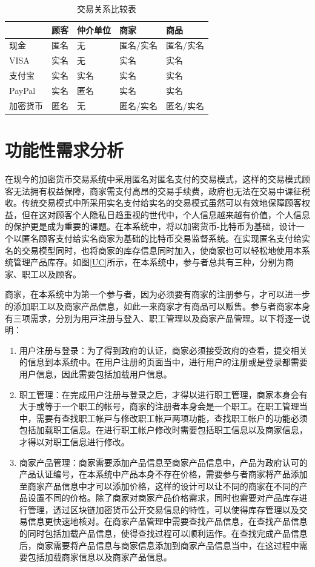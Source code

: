		\begin{table}[!htbp]
		\centering
		\caption{交易关系比较表}
		\label{txvs}
		\begin{tabular}{|l|l|l|l|l|}
		\hline
		 & 顾客 & 仲介单位 & 商家 & 商品 \\ \hline
		现金 & 匿名 & 无 & 匿名/实名 & 匿名/实名 \\ \hline
		VISA & 实名 & 无 & 实名 & 实名 \\ \hline
		支付宝 & 实名 & 实名 & 实名 & 实名 \\ \hline
		PayPal & 实名 & 匿名 & 实名 & 实名 \\ \hline
		加密货币 & 匿名 & 无 & 匿名/实名 & 匿名/实名 \\ \hline
		\end{tabular}
		\end{table}

\section{功能性需求分析}

在现今的加密货币交易系统中采用匿名对匿名⽀付的交易模式，这样的交易模式顾客无法拥有权益保障，商家需支付高昂的交易手续费，政府也无法在交易中课征税收。传统交易模式中所采用实名⽀付给实名的交易模式虽然可以有效地保障顾客权益，但在这对顾客个⼈隐私⽇趋重视的世代中，个⼈信息越来越有价值，个⼈信息的保护更是成为重要的课题。在本系统中，将以加密货币-⽐特币为基础，设计⼀个以匿名顾客⽀付给实名商家为基础的比特币交易监督系统。在实现匿名⽀付给实名的交易模型同时，也将商家的库存信息同时加⼊，使商家也可以轻松地使用本系统管理产品库存。如图\ref{UC}所示，在本系统中，参与者总共有三种，分别为商家、职⼯以及顾客。

商家，在本系统中为第⼀个参与者，因为必须要有商家的注册参与，才可以进⼀步的添加职⼯以及商家产品信息，如此⼀来商家才有商品可以贩售。参与者商家本⾝有三项需求，分别为⽤⼾注册与登⼊、职⼯管理以及商家产品管理。以下将逐⼀说明：


	\begin{enumerate}
	\item 用户注册与登录：为了得到政府的认证，商家必须接受政府的查看，提交相关的信息到本系统中。在用户注册的页面当中，进行用户的注册或是登录都需要用户信息，因此需要包括加载用户信息。
	\item 职工管理：在完成用户注册与登录之后，才得以进行职工管理，商家本身会有大于或等于一个职工的帐号，商家的注册者本身会是一个职工。在职工管理当中，需要有查找职⼯帐⼾与修改职⼯帐⼾两项功能，查找职工帐户的功能必须包括加载职工信息。在进行职工帐户修改时需要包括职工信息以及商家信息，才得以对职工信息进行修改。
	\item 商家产品管理：商家需要添加产品信息至商家产品信息中，产品为政府认可的产品认证编号，在本系统中产品本身不存在价格，需要参与者商家将产品添加至商家产品信息中才可以添加价格，这样的设计可以让不同的商家在不同的产品设置不同的价格。除了商家对商家产品价格需求，同时也需要对产品库存进行管理，透过区块链加密货币公开交易信息的特性，可以使得库存管理以及交易信息更快速地核对。在商家产品管理中需要查找产品信息，在查找产品信息的同时包括加载产品信息，使得查找过程可以顺利运作。在查找完成产品信息后，商家需要将产品信息与商家信息添加到商家产品信息当中，在这过程中需要包括加载商家信息以及商家产品信息。

	\end{enumerate}

